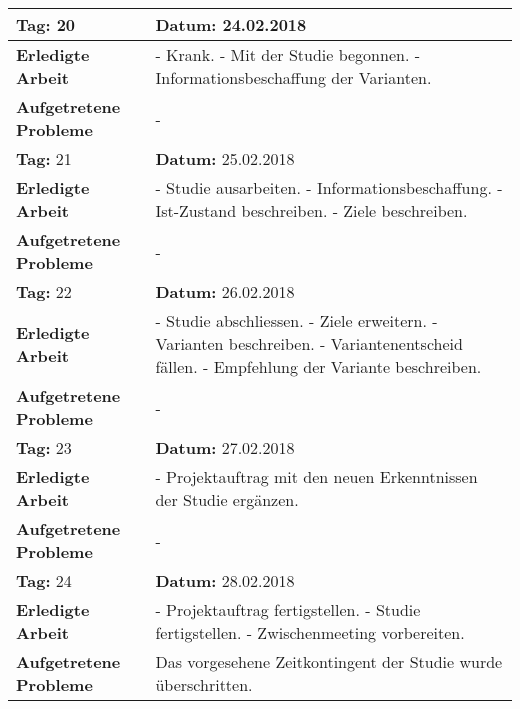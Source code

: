 \begin{longtable}{|p{5cm}|p{5cm}p{6cm}|}
\rowcolor{heading}\textbf{Tag:} 20 & \textbf{Datum:} 24.02.2018 & \\ \hline
\textbf{Erledigte Arbeit} & \multicolumn{2}{p{11cm}|}{- Krank. \newline
- Mit der Studie begonnen. \newline
- Informationsbeschaffung der Varianten.} \\ \hline
\textbf{Aufgetretene Probleme} & \multicolumn{2}{p{11cm}|}{-} \\ \hline
\rowcolor{heading}\textbf{Tag:} 21 & \textbf{Datum:} 25.02.2018 & \\ \hline
\textbf{Erledigte Arbeit} & \multicolumn{2}{p{11cm}|}{- Studie ausarbeiten. \newline
- Informationsbeschaffung. \newline
- Ist-Zustand beschreiben. \newline
- Ziele beschreiben.} \\ \hline
\textbf{Aufgetretene Probleme} & \multicolumn{2}{p{11cm}|}{-} \\ \hline
\rowcolor{heading}\textbf{Tag:} 22 & \textbf{Datum:} 26.02.2018 & \\ \hline
\textbf{Erledigte Arbeit} & \multicolumn{2}{p{11cm}|}{- Studie abschliessen. \newline
- Ziele erweitern. \newline
- Varianten beschreiben. \newline
- Variantenentscheid fällen. \newline
- Empfehlung der Variante beschreiben.} \\ \hline
\textbf{Aufgetretene Probleme} & \multicolumn{2}{p{11cm}|}{-} \\ \hline
\rowcolor{heading}\textbf{Tag:} 23 & \textbf{Datum:} 27.02.2018 & \\ \hline
\textbf{Erledigte Arbeit} & \multicolumn{2}{p{11cm}|}{- Projektauftrag mit den neuen Erkenntnissen der Studie ergänzen.} \\ \hline
\textbf{Aufgetretene Probleme} & \multicolumn{2}{p{11cm}|}{-} \\ \hline
\rowcolor{heading}\textbf{Tag:} 24 & \textbf{Datum:} 28.02.2018 & \\ \hline
\textbf{Erledigte Arbeit} & \multicolumn{2}{p{11cm}|}{- Projektauftrag fertigstellen. \newline
- Studie fertigstellen.
- Zwischenmeeting vorbereiten.} \\ \hline
\textbf{Aufgetretene Probleme} & \multicolumn{2}{p{11cm}|}{Das vorgesehene Zeitkontingent der Studie wurde überschritten.} \\ \hline

\end{longtable}
